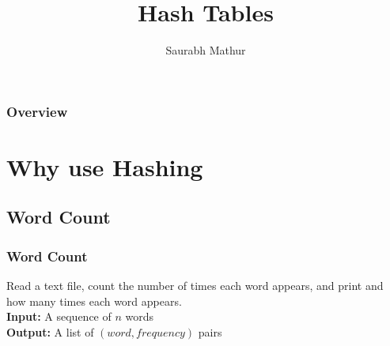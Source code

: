 \documentclass{beamer}
\title[Hash Tables]{Hash Tables} %
\author{Saurabh Mathur } %
\institute[VIT U] %
{
VIT University \\ %
\medskip
\textit{14BIT0180} %
}
\begin{document}
\begin{frame}
\titlepage %
\end{frame}

\begin{frame}
\frametitle{Overview} %
\tableofcontents %
\end{frame}


\section{Why use Hashing} %

\subsection{Word Count} %

\begin{frame}
\frametitle{Word Count}
Read a text file, count the number of times each word appears, and print and how many times each word appears.\\\medskip
    \textbf{Input:} A sequence of $n$ words \\
    \textbf{Output:} A list of $(word, frequency)$ pairs


\end{frame}

\end{document}
